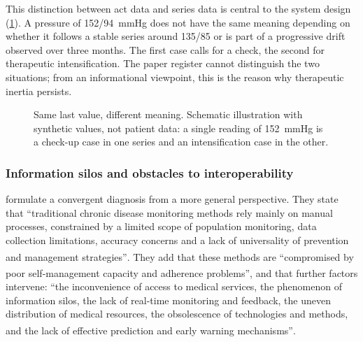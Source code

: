 \documentclass[12pt,a4paper,oneside]{report}
\newcommand{\bq}[1]{``#1''\textsuperscript{\dag}}
\begin{document}
This distinction between act data and series data is central to the system design (\cref{fig:act-series}). A pressure of 152/94~mmHg does not have the same meaning depending on whether it follows a stable series around 135/85 or is part of a progressive drift observed over three months. The first case calls for a check, the second for therapeutic intensification. The paper register cannot distinguish the two situations; from an informational viewpoint, this is the reason why therapeutic inertia persists.

\begin{figure}[htbp]
\centering
{}
\caption{Same last value, different meaning. Schematic illustration with synthetic values, not patient data: a single reading of 152~mmHg is a check-up case in one series and an intensification case in the other.}\label{fig:act-series}
\end{figure}

\subsubsection{Information silos and obstacles to interoperability}

\textcite{liu2025review} formulate a convergent diagnosis from a more general perspective. They state that \bq{traditional chronic disease monitoring methods rely mainly on manual processes, constrained by a limited scope of population monitoring, data collection limitations, accuracy concerns and a lack of universality of prevention and management strategies}. They add that these methods are \bq{compromised by poor self-management capacity and adherence problems}, and that further factors intervene: \bq{the inconvenience of access to medical services, the phenomenon of information silos, the lack of real-time monitoring and feedback, the uneven distribution of medical resources, the obsolescence of technologies and methods, and the lack of effective prediction and early warning mechanisms}.
\end{document}
